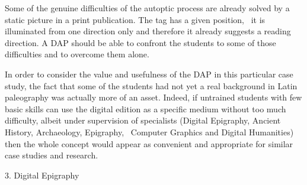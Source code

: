 \documentclass[amsthm,ebook]{saparticle}
\begin{document}
Some of the genuine difficulties of the autoptic process are already solved by a static picture in a print publication.
The tag has a given position, \ it is illuminated from one direction only and therefore it already suggests a reading
direction. A DAP should be able to confront the students to some of those difficulties and to overcome them alone.

In order to consider the value and usefulness of the DAP in this particular case study, the fact that some of the
students had not yet a real background in Latin paleography was actually more of an asset. Indeed, if untrained
students with few basic skills can use the digital edition as a specific medium without too much difficulty, albeit
under supervision of specialists (Digital Epigraphy, Ancient History, Archaeology, Epigraphy, \ Computer Graphics and
Digital Humanities) then the whole concept would appear as convenient and appropriate for similar case studies and
research. 

3. Digital Epigraphy
\end{document}
